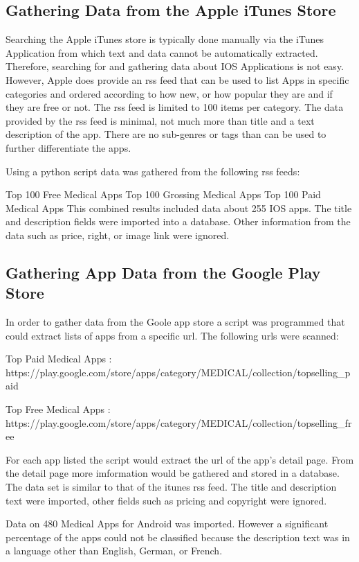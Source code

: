 \subsection{Gathering Data from the Apple iTunes Store}

Searching the Apple iTunes store is typically done manually via the iTunes Application from which text and data cannot be automatically extracted. Therefore, searching for and gathering data about IOS Applications is not easy. However, Apple does provide an rss feed that can be used to list Apps in specific categories and ordered according to how new, or how popular they are and if they are free or not. The rss feed is limited to 100 items per category. The data provided by the rss feed is minimal, not much more than title and a text description of the app. There are no sub-genres or tags than can be used to further differentiate the apps.

Using a python script data was gathered from the following rss feeds:

Top 100 Free Medical Apps
Top 100 Grossing Medical Apps
Top 100 Paid Medical Apps
This combined results included data about 255 IOS apps. The title and description fields were imported into a database. Other information from the data such as price, right, or image link were ignored.


\subsection{Gathering App Data from the Google Play Store}

In order to gather data from the Goole app store a script was programmed that could extract lists of apps from a specific url. The following urls were scanned:

Top Paid Medical Apps : https://play.google.com/store/apps/category/MEDICAL/collection/topselling_paid

Top Free Medical Apps : https://play.google.com/store/apps/category/MEDICAL/collection/topselling_free

For each app listed the script would extract the url of the app's detail page. From the detail page more imformation would be gathered and stored in a database. The data set is similar to that of the itunes rss feed. The title and description text were imported, other fields such as pricing and copyright were ignored.

Data on 480 Medical Apps for Android was imported. However a significant percentage of the apps could not be classified because the description text was in a language other than English, German, or French.